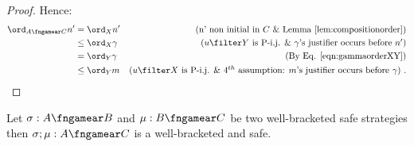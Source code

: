 \begin{proof}
Hence:
\begin{align*}
\ord_{A\fngamear C} n' 
& = \ord_{X} n' & \mbox{(n' non initial in $C$ \& Lemma \ref{lem:compositionorder})} \\
& \leq \ord_{X} \gamma & \mbox{($u\filter Y$ is P-i.j. \& $\gamma$'s justifier occurs before $n'$)} \\
& = \ord_{Y} \gamma & \mbox{(By Eq. \ref{eqn:gammaorderXY})} \\
& \leq \ord_{Y} m & \mbox{($u\filter X$ is P-i.j. \& 
4$^{th}$ assumption: $m$'s justifier occurs before $\gamma$)} \ . 
\end{align*}
\end{proof}


\begin{proposition}
\label{prop:pijcompose_when_orda_geq_ordb}
Let $\sigma : A \fngamear B$ and $\mu : B \fngamear C$
be two well-bracketed safe strategies
then $\sigma ; \mu : A \fngamear C$ 
is a well-bracketed and safe.
\end{proposition}

